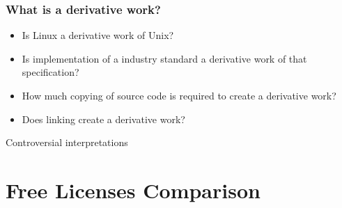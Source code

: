 \documentclass{beamer}
\begin{document}
\begin{frame}
\frametitle{What is a derivative work?}

\begin{itemize}

\item Is Linux a derivative work of Unix?
\item Is implementation of a industry standard a derivative work of that specification?
\item How much copying of source code is required to create a derivative work?
\item Does linking create a derivative work?
\end{itemize}

\begin{center}
Controversial interpretations
\end{center}

\end{frame}

\section{Free Licenses Comparison}
\end{document}

